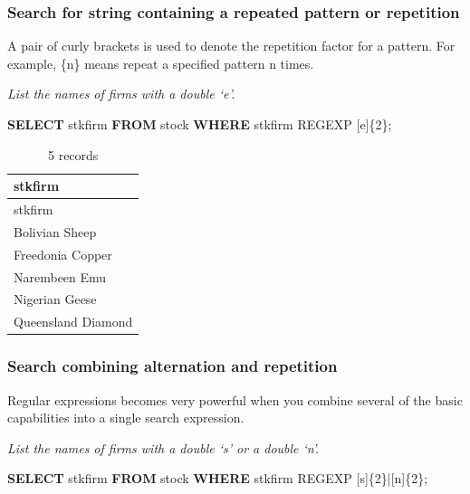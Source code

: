 \documentclass[
]{article}
\newenvironment{Shaded}{\begin{snugshade}}{\end{snugshade}}
\newcommand{\KeywordTok}[1]{\textcolor[rgb]{0.13,0.29,0.53}{\textbf{#1}}}
\newcommand{\NormalTok}[1]{#1}
\newcommand{\StringTok}[1]{\textcolor[rgb]{0.31,0.60,0.02}{#1}}
\begin{document}
\hypertarget{search-for-string-containing-a-repeated-pattern-or-repetition}{%
\subsubsection{Search for string containing a repeated pattern or
repetition}\label{search-for-string-containing-a-repeated-pattern-or-repetition}}

A pair of curly brackets is used to denote the repetition factor for a
pattern. For example, \{n\} means repeat a specified pattern n times.

\emph{List the names of firms with a double `e'.}

\begin{Shaded}
\begin{Highlighting}[]
\KeywordTok{SELECT}\NormalTok{ stkfirm }\KeywordTok{FROM}\NormalTok{ stock }\KeywordTok{WHERE}\NormalTok{ stkfirm REGEXP }\StringTok{\textquotesingle{}[e]\{2\}\textquotesingle{}}\NormalTok{;}
\end{Highlighting}
\end{Shaded}

\begin{longtable}[]{@{}l@{}}
\caption{5 records}\tabularnewline
\toprule()
stkfirm \\
\midrule()
\endfirsthead
\toprule()
stkfirm \\
\midrule()
\endhead
Bolivian Sheep \\
Freedonia Copper \\
Narembeen Emu \\
Nigerian Geese \\
Queensland Diamond \\
\bottomrule()
\end{longtable}

\hypertarget{search-combining-alternation-and-repetition}{%
\subsubsection{Search combining alternation and
repetition}\label{search-combining-alternation-and-repetition}}

Regular expressions becomes very powerful when you combine several of
the basic capabilities into a single search expression.

\emph{List the names of firms with a double `s' or a double `n'.}

\begin{Shaded}
\begin{Highlighting}[]
\KeywordTok{SELECT}\NormalTok{ stkfirm }\KeywordTok{FROM}\NormalTok{ stock }\KeywordTok{WHERE}\NormalTok{ stkfirm REGEXP }\StringTok{\textquotesingle{}[s]\{2\}|[n]\{2\}\textquotesingle{}}\NormalTok{;}
\end{Highlighting}
\end{Shaded}
\end{document}
